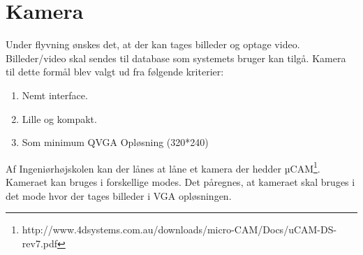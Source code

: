 \section{Kamera}

Under flyvning ønskes det, at der kan tages billeder og optage video. Billeder/video skal sendes til database som systemets bruger kan tilgå. Kamera til dette formål blev valgt ud fra følgende kriterier:   
\begin{enumerate}[label*=\arabic*.]
	\item Nemt interface.
	\item Lille og kompakt. 
	\item Som minimum QVGA Opløsning (320*240) 
\end{enumerate}

\vspace{1cm}

Af Ingeniørhøjskolen kan der lånes at låne et kamera der hedder µCAM\footnote{http://www.4dsystems.com.au/downloads/micro-CAM/Docs/uCAM-DS-rev7.pdf}. Kameraet kan bruges i forskellige modes. Det påregnes, at kameraet skal bruges i det mode hvor der tages billeder i VGA opløsningen. 

